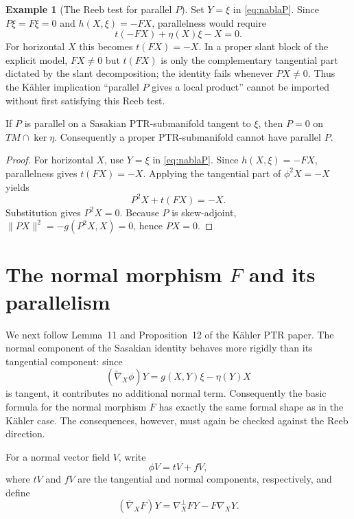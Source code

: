 \documentclass[11pt]{article}
\theoremstyle{definition}\newtheorem{definition}[theorem]{Definition}\newtheorem{example}[theorem]{Example}
\theoremstyle{remark}\newtheorem{remark}[theorem]{Remark}
\begin{document}
\begin{example}[The Reeb test for parallel $P$]\label{ex:parallelP}
Set $Y=\xi$ in \eqref{eq:nablaP}.  Since $P\xi=F\xi=0$ and $h(X,\xi)=-FX$, parallelness would require
\[
 t(-FX)+\eta(X)\xi-X=0.
\]
For horizontal $X$ this becomes $t(FX)=-X$.  In a proper slant block of the explicit model, $FX\neq0$ but $t(FX)$ is only the complementary tangential part dictated by the slant decomposition; the identity fails whenever $PX\neq0$.  Thus the K\"ahler implication ``parallel $P$ gives a local product'' cannot be imported without first satisfying this Reeb test.
\end{example}

\begin{proposition}\label{prop:parallelP-proper}
If $P$ is parallel on a Sasakian PTR-submanifold tangent to $\xi$, then $P=0$ on $TM\cap\ker\eta$.  Consequently a proper PTR-submanifold cannot have parallel $P$.
\end{proposition}
\begin{proof}
For horizontal $X$, use $Y=\xi$ in \eqref{eq:nablaP}.  Since $h(X,\xi)=-FX$, parallelness gives $t(FX)=-X$.  Applying the tangential part of $\phi^2X=-X$ yields
\[
 P^2X+t(FX)=-X.
\]
Substitution gives $P^2X=0$.  Because $P$ is skew-adjoint,
$\|PX\|^2=-g(P^2X,X)=0$, hence $PX=0$.
\end{proof}




\section{The normal morphism \texorpdfstring{$F$}{F} and its parallelism}
We next follow Lemma~11 and Proposition~12 of the K\"ahler PTR paper.  The normal component of the Sasakian identity behaves more rigidly than its tangential component: since
\[
 (\widetilde\nabla_X\phi)Y=g(X,Y)\xi-\eta(Y)X
\]
is tangent, it contributes no additional normal term.  Consequently the basic formula for the normal morphism $F$ has exactly the same formal shape as in the K\"ahler case.  The consequences, however, must again be checked against the Reeb direction.

For a normal vector field $V$, write
\[
 \phi V=tV+fV,
\]
where $tV$ and $fV$ are the tangential and normal components, respectively, and define
\[
 (\bar\nabla_XF)Y=\nabla_X^\perp FY-F\nabla_XY.
\]
\end{document}

